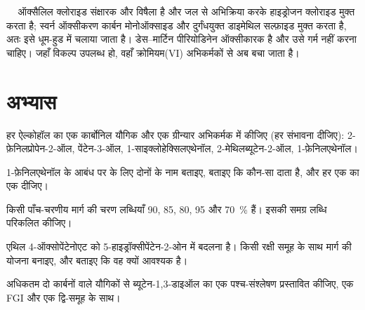 \begin{safety}{\,\,\,\,\,}
ऑक्सैलिल क्लोराइड संक्षारक और विषैला है और जल से अभिक्रिया करके हाइड्रोजन क्लोराइड मुक्त करता है; स्वर्न
ऑक्सीकरण कार्बन मोनोऑक्साइड और दुर्गंधयुक्त डाइमेथिल सल्फ़ाइड मुक्त करता है, अतः इसे धूम-हुड में चलाया जाता है।
डेस--मार्टिन पीरियोडिनेन ऑक्सीकारक है और उसे गर्म नहीं करना चाहिए। जहाँ विकल्प उपलब्ध हो, वहाँ क्रोमियम(VI) अभिकर्मकों से
अब बचा जाता है।
\end{safety}

\section{अभ्यास}

\begin{exercise}[$\star$]\label{exo:b2:retrosynthesis:1}
हर ऐल्कोहॉल का एक कार्बोनिल यौगिक और एक ग्रीन्यार अभिकर्मक में  कीजिए (हर संभावना दीजिए):
2-फ़ेनिलप्रोपेन-2-ऑल, पेंटेन-3-ऑल, 1-साइक्लोहेक्सिलएथेनॉल, 2-मेथिलब्यूटेन-2-ऑल, 1-फ़ेनिलएथेनॉल।
\end{exercise}

\begin{exercise}[$\star$]\label{exo:b2:retrosynthesis:2}
1-फ़ेनिलएथेनॉल के  आबंध पर  के लिए दोनों  के नाम बताइए, बताइए कि कौन-सा
दाता है, और हर एक का एक  दीजिए।
\end{exercise}

\begin{exercise}[$\star$]\label{exo:b2:retrosynthesis:3}
किसी पाँच-चरणीय मार्ग की चरण लब्धियाँ 90, 85, 80, 95 और 70~\% हैं। इसकी समग्र लब्धि परिकलित कीजिए।
\end{exercise}

\begin{exercise}[$\star$]\label{exo:b2:retrosynthesis:4}
एथिल 4-ऑक्सोपेंटेनोएट को 5-हाइड्रॉक्सीपेंटेन-2-ओन में बदलना है। किसी रक्षी
समूह के साथ मार्ग की योजना बनाइए, और बताइए कि वह क्यों आवश्यक है।
\end{exercise}

\begin{exercise}[$\star\star$]\label{exo:b2:retrosynthesis:5}
अधिकतम दो कार्बनों वाले यौगिकों से ब्यूटेन-1,3-डाइऑल का एक पश्च-संश्लेषण प्रस्तावित कीजिए, एक FGI और एक
द्वि-समूह  के साथ।
\end{exercise}

